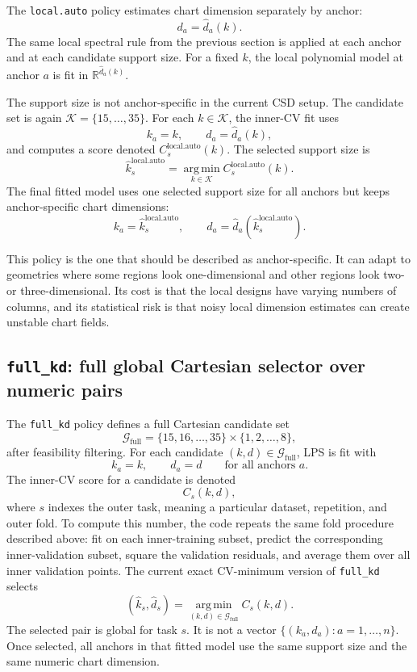 \documentclass[11pt]{article}
\newcommand{\R}{\mathbb{R}}
\newcommand{\Gfull}{\mathcal G_{\mathrm{full}}}
\newcommand{\argmin}{\operatorname*{arg\,min}}
\newcommand{\code}[1]{\texttt{#1}}
\begin{document}
The \code{local.auto} policy estimates chart dimension separately by anchor:
\[
  d_a=\widehat d_a(k).
\]
The same local spectral rule from the previous section is applied at each anchor
and at each candidate support size.  For a fixed $k$, the local polynomial model
at anchor $a$ is fit in $\R^{\widehat d_a(k)}$.

The support size is not anchor-specific in the current CSD setup.  The candidate
set is again $\mathcal K=\{15,\ldots,35\}$.  For each $k\in\mathcal K$, the
inner-CV fit uses
\[
  k_a=k,\qquad d_a=\widehat d_a(k),
\]
and computes a score denoted $C_s^{\mathrm{local.auto}}(k)$.  The selected
support size is
\[
  \widehat k_s^{\mathrm{local.auto}}
  =
  \argmin_{k\in\mathcal K} C_s^{\mathrm{local.auto}}(k).
\]
The final fitted model uses one selected support size for all anchors but keeps
anchor-specific chart dimensions:
\[
  k_a=\widehat k_s^{\mathrm{local.auto}},
  \qquad
  d_a=\widehat d_a\!\left(\widehat k_s^{\mathrm{local.auto}}\right).
\]

This policy is the one that should be described as anchor-specific.  It can adapt
to geometries where some regions look one-dimensional and other regions look
two- or three-dimensional.  Its cost is that the local designs have varying
numbers of columns, and its statistical risk is that noisy local dimension
estimates can create unstable chart fields.

\subsection{\code{full\_kd}: full global Cartesian selector over numeric pairs}

The \code{full\_kd} policy defines a full Cartesian candidate set
\[
  \Gfull
  =
  \{15,16,\ldots,35\}\times\{1,2,\ldots,8\},
\]
after feasibility filtering.  For each candidate $(k,d)\in\Gfull$, LPS is fit
with
\[
  k_a=k,\qquad d_a=d\qquad\text{for all anchors }a.
\]
The inner-CV score for a candidate is denoted
\[
  C_s(k,d),
\]
where $s$ indexes the outer task, meaning a particular dataset, repetition, and
outer fold.  To compute this number, the code repeats the same fold procedure
described above: fit on each inner-training subset, predict the corresponding
inner-validation subset, square the validation residuals, and average them over
all inner validation points.  The current exact CV-minimum version of
\code{full\_kd} selects
\[
  (\widehat k_s,\widehat d_s)
  =
  \argmin_{(k,d)\in\Gfull} C_s(k,d).
\]
The selected pair is global for task $s$.  It is not a vector
$\{(k_a,d_a):a=1,\ldots,n\}$.  Once selected, all anchors in that fitted model
use the same support size and the same numeric chart dimension.
\end{document}
